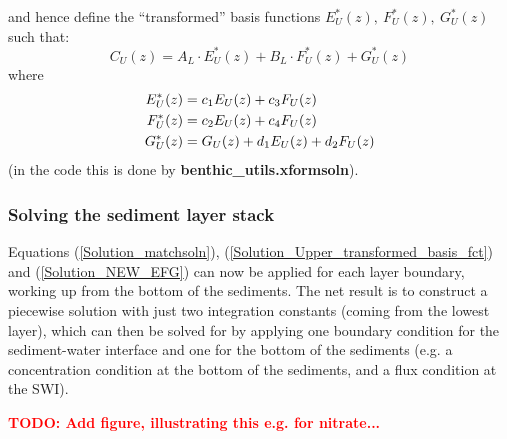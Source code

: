 \documentclass[gmd, manuscript]{copernicus}
\begin{document}
and hence define the ``transformed'' basis functions $E_U^*(z),\ F_U^*(z),\ G_U^*(z)$ such that:
\begin{equation}
 C_U(z) = A_L \cdot E_U^*(z) + B_L \cdot F_U^*(z) + G_U^*(z) \label{Solution_Upper_transformed_basis_fct}
\end{equation}
where
\begin{align}
 E_U^*(z) &= c_1 E_U(z) + c_3 F_U(z) \notag\\
 F_U^*(z) &= c_2 E_U(z) + c_4 F_U(z) \label{Solution_NEW_EFG}\\
 G_U^*(z) &= G_U(z) + d_1 E_U(z) + d_2 F_U(z) \notag
\end{align}
(in the code this is done by \textsf{\textbf{benthic\_utils.xformsoln}}).


\subsubsection*{Solving the sediment layer stack}
Equations (\ref{Solution_matchsoln}), (\ref{Solution_Upper_transformed_basis_fct}) and (\ref{Solution_NEW_EFG}) can now be applied for each layer boundary, working up from the bottom of the sediments. 
The net result is to construct a piecewise solution with just two integration constants (coming from the lowest layer), which can then be solved for by applying one boundary condition for the sediment-water interface 
and one for the bottom of the sediments (e.g. a concentration condition at the bottom of the sediments, and a flux condition at the SWI).

\textbf{\textcolor{red}{TODO: Add figure, illustrating this e.g. for nitrate...}}%
\end{document}
